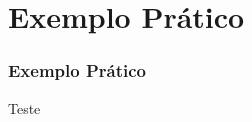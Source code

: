 \documentclass[../main/main.tex]{subfiles}
\begin{document}
    \section{Exemplo Prático}
    
    
    \begin{frame}
        \frametitle{Exemplo Prático}
    \end{frame}
    
    
    
    \begin{frame}
        Teste
    \end{frame}
    
    
\end{document}
